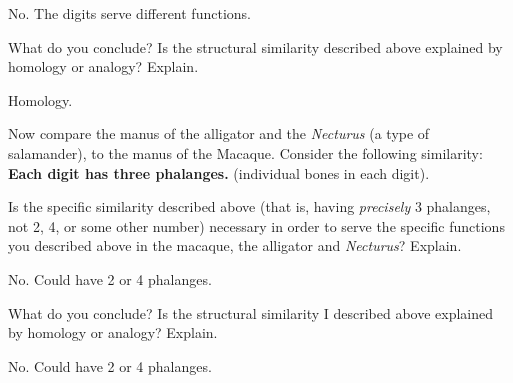 \documentclass[12pt, hidelinks]{exam}
\newcommand*\AnswerBox[2]{%
    \parbox[t][#1]{0.92\textwidth}{%
    \begin{solution}#2\end{solution}}
    \vspace{\stretch{1}}
}
\begin{document}
\begin{questions}
	\AnswerBox{3\baselineskip}{No. The digits serve different functions.}

\question
What do you conclude? Is the structural similarity described above explained by homology or analogy? Explain. 

	\AnswerBox{3\baselineskip}{Homology.}

\newpage

\question
Now compare the manus of the alligator and the \textit{Necturus} (a type of salamander), to the manus of the Macaque. Consider the following similarity:  \textbf{Each digit has three phalanges.} (individual bones in each digit).


\question
Is the specific similarity described above (that is, having \emph{precisely} 3 phalanges, not 2, 4, or some other number) necessary in order to serve the specific functions you described above in the macaque, the alligator and \textit{Necturus}?   Explain.


	\AnswerBox{3\baselineskip}{No. Could have 2 or 4 phalanges.}


\question 
What do you conclude?  Is the structural similarity I described above explained by homology or analogy? Explain.

	\AnswerBox{3\baselineskip}{No. Could have 2 or 4 phalanges.}

%



\end{questions}
\end{document}
